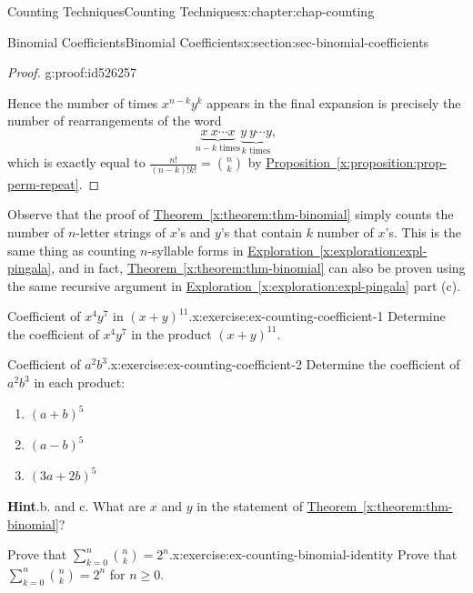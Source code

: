 \documentclass[oneside,10pt,]{book}
\newcommand{\blocktitlefont}{\relax}
\newcommand{\xreffont}{\relax}
\numberwithin{equation}{section}
\begin{document}
\begin{chapterptx}{Counting Techniques}{}{Counting Techniques}{}{}{x:chapter:chap-counting}
\begin{sectionptx}{Binomial Coefficients}{}{Binomial Coefficients}{}{}{x:section:sec-binomial-coefficients}
\begin{proof}{}{g:proof:id526257}
\par
Hence the number of times \(x^{n-k}y^k\) appears in the final expansion is precisely the number of rearrangements of the word%
\begin{equation*}
\underbrace{x\ x\cdots x}_\text{$n-k$ times}\underbrace{y\ y\cdots y}_\text{$k$ times},
\end{equation*}
which is exactly equal to \(\frac{n!}{(n-k)!k!} = \binom{n}{k}\) by \hyperref[x:proposition:prop-perm-repeat]{Proposition~{\xreffont\ref{x:proposition:prop-perm-repeat}}}.%
\end{proof}
Observe that the proof of \hyperref[x:theorem:thm-binomial]{Theorem~{\xreffont\ref{x:theorem:thm-binomial}}} simply counts the number of \(n\)-letter strings of \(x\)'s and \(y\)'s that contain \(k\) number of \(x\)'s. This is the same thing as counting \(n\)-syllable forms in \hyperref[x:exploration:expl-pingala]{Exploration~{\xreffont\ref{x:exploration:expl-pingala}}}, and in fact, \hyperref[x:theorem:thm-binomial]{Theorem~{\xreffont\ref{x:theorem:thm-binomial}}} can also be proven using the same recursive argument in \hyperref[x:exploration:expl-pingala]{Exploration~{\xreffont\ref{x:exploration:expl-pingala}}} part (c).%
\begin{inlineexercise}{Coefficient of \(x^4y^7\) in \((x+y)^{11}\).}{x:exercise:ex-counting-coefficient-1}%
Determine the coefficient of \(x^4y^7\) in the product \((x+y)^{11}\).%
\end{inlineexercise}%
\begin{inlineexercise}{Coefficient of \(a^2b^3\).}{x:exercise:ex-counting-coefficient-2}%
Determine the coefficient of \(a^2b^3\) in each product:%
\begin{enumerate}[label=(\alph*)]
\item{}\(\displaystyle (a+b)^5\)%
\item{}\(\displaystyle (a-b)^5\)%
\item{}\(\displaystyle (3a+2b)^5\)%
\end{enumerate}
%
\par\smallskip%
\noindent\textbf{\blocktitlefont Hint}.\hypertarget{g:hint:id526434}{}\quad{}b. and c. What are \(x\) and \(y\) in the statement of \hyperref[x:theorem:thm-binomial]{Theorem~{\xreffont\ref{x:theorem:thm-binomial}}}?%
\end{inlineexercise}%
\begin{inlineexercise}{Prove that \(\displaystyle\sum_{k=0}^n \binom{n}{k} = 2^n\).}{x:exercise:ex-counting-binomial-identity}%
Prove that \(\displaystyle\sum_{k=0}^n \binom{n}{k} = 2^n\) for \(n \geq 0\).%

\end{inlineexercise}
\end{sectionptx}
\end{chapterptx}
\end{document}
